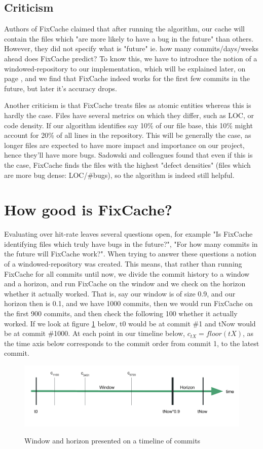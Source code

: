 \documentclass[12pt,twoside,notitlepage]{report}
\newcommand{\fxch}{FixCache}
\begin{document}
\subsection{Criticism}
Authors of \fxch{} claimed that after running the algorithm, our cache will contain the files which "are more likely to have a bug in the future" than others. However, they did not specify what is "future" ie. how many commits/days/weeks ahead does \fxch{} predict? To know this, we have to introduce the notion of a windowed-repository to our implementation, which will be explained later, on page \pageref{windowedrep}, and we find that \fxch{} indeed works for the first few commits in the future, but later it's accuracy drops.

Another criticism is that \fxch{} treats files as atomic entities whereas this is hardly the case. Files have several metrics on which they differ, such as LOC, or code density. If our algorithm identifies say 10\% of our file base, this 10\% might account for 20\% of all lines in the repository. This will be generally the case, as longer files are expected to have more impact and importance on our project, hence they'll have more bugs. Sadowski and colleagues \cite{Bugcache} found that even if this is the case, \fxch{} finds the files with the highest "defect densities" (files which are more bug dense: LOC/\#bugs), so the algorithm is indeed still helpful.

\section{How good is \fxch{}?}\label{windowedrep}
Evaluating over hit-rate leaves several questions open, for example "Is \fxch{} identifying files which truly have bugs in the future?", "For how many commits in the future will \fxch{} work?". When trying to answer these questions a notion of a windowed-repository was created. This means, that rather than running \fxch{} for all commits until now, we divide the commit history to a window and a horizon, and run \fxch{} on the window and we check on the horizon whether it actually worked. That is, say our window is of size 0.9, and our horizon then is 0.1, and we have 1000 commits, then we would run \fxch{} on the first 900 commits, and then check the following 100 whether it actually worked. If we look at figure \ref{fig:window_horizon} below, t0 would be at commit \#1 and tNow would be at commit \#1000. At each point in our timeline below, $c_{tX} = floor(tX)$, as the time axis below corresponds to the commit order from commit 1, to the latest commit.
\begin{figure}[h]
\includegraphics[width=1.0\textwidth]{window_horizon.png}
\label{fig:window_horizon}
\caption{Window and horizon presented on a timeline of commits}
\end{figure}
\end{document}

